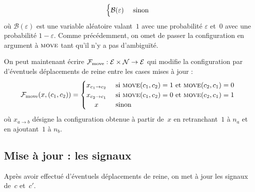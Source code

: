 \begin{itemize}
{\[\begin{cases}
      \hfill \mathcal{B}(\varepsilon)\hfill  & \text{ sinon} \\
    \end{cases}
\]
où $\mathcal{B}(\varepsilon)$ est une variable aléatoire valant~$1$ avec une probabilité $\varepsilon$ et~$0$ avec une probabilité $1-\varepsilon$. Comme précédemment, on omet de passer la configuration en argument à $\textsc{move}$ tant qu'il n'y a pas d'ambiguïté.
}


\end{itemize}

\medskip

On peut maintenant écrire $\mathcal{F}_{\mathrm{move}} : \mathcal{E}\times\mathcal{N}\to\mathcal{E}$ qui modifie la configuration par d'éventuels déplacements de reine entre les cases mises à jour :  \[
\mathcal{F}_{\mathrm{move}}(x,(c_1, c_2)) = 
\begin{cases}
  \hfill x_{c_1\to c_2} \hfill & \text{ si $\M(c_1, c_2) = 1$ et $\M(c_2, c_1) = 0$} \\
  \hfill x_{c_2 \to c_1} \hfill & \text{ si $\M(c_1, c_2) = 0$ et $\M(c_2, c_1) = 1$} \\
  \hfill x \hfill & \text{ sinon} \\
  \end{cases}
\]
où $x_{a \to b}$ désigne la configuration obtenue à partir de~$x$ en retranchant~$1$ à $n_{a}$ et en ajoutant~$1$ à $n_{b}$. 

\medskip



\subsection{Mise à jour : les signaux}  

Après avoir effectué d'éventuels déplacements de reine, on met à jour les signaux de~$c$ et~$c'$. 


